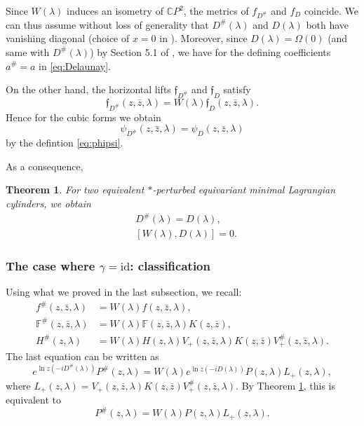 \documentclass[a4paper,11pt]{amsart}
\newtheorem{theorem}{Theorem}[section]
\theoremstyle{definition}
\numberwithin{equation}{section}
\begin{document}
Since $W(\lambda)$ induces an isometry of $\mathbb{C} P^2$, the metrics of  $f_{D^{\#}}$ and $f_{D}$ coincide. 
We can thus assume without loss of generality that $D^{\#}(\lambda)$ and $D(\lambda)$ both have vanishing diagonal (choice of $x=0$ in \cite{DoMaNL}). Moreover, since $D(\lambda)=\Omega(0)$ (and same with $D^{\#}(\lambda)$) by Section 5.1 of \cite{DoMaNL} , we have for the defining coefficients $a^{\#}=a$ in \eqref{eq:Delaunay}.


On the other hand, the horizontal lifts $\mathfrak{f}_{D^{\#}}$ and   $\mathfrak{f}_D$ satisfy
$$\mathfrak{f}_{D^{\#}}(z,\bar{z},\lambda)=W(\lambda) \mathfrak{f}_{D}(z,\bar{z},\lambda).$$
Hence for the cubic forms we obtain
$$\psi_{D^{\#}}(z,\bar{z},\lambda)=\psi_{D}(z,\bar{z},\lambda)$$
by the defintion \eqref{eq:phipsi}.  

As a consequence,
\begin{theorem}\label{thm:3.10}
For two equivalent $*$-perturbed equivariant minimal Lagrangian cylinders, we obtain
\begin{equation}\label{eq:3.10}
\begin{aligned}
& D^{\#}(\lambda)=D(\lambda),\\
& [W(\lambda), D(\lambda)]=0. 
\end{aligned}
\end{equation}
\end{theorem} 

\subsubsection{\textbf{The case where $\gamma=\mathrm{id}$: classification}}

Using what we proved in the last subsection, we recall:
\begin{equation*}
\begin{aligned}
f^{\#}(z,\bar{z},\lambda)&=W(\lambda) f(z,\bar{z},\lambda),\\
\mathbb{F}^{\#}(z,\bar{z},\lambda)&= W(\lambda) \mathbb{F}(z,\bar{z},\lambda)K(z,\bar{z}),\\
H^{\#}(z,\lambda)&= W(\lambda) H(z,\lambda)V_+(z,\bar{z},\lambda) K(z,\bar{z})V_+^{\#}(z,\bar{z},\lambda).
\end{aligned}
\end{equation*}
The last equation  can be written as
$$e^{\ln z(-iD^{\#}(\lambda))}P^{\#}(z,\lambda)=W(\lambda) e^{\ln z(-iD(\lambda))} P(z,\lambda) L_+(z,\lambda),$$
where $L_+(z,\lambda)=V_+(z,\bar{z},\lambda) K(z,\bar{z})V_+^{\#}(z,\bar{z},\lambda)$.
By Theorem \ref{thm:3.10}, this is equivalent to 
\begin{equation}\label{eq:4.1}
P^{\#}(z,\lambda)=W(\lambda)P(z,\lambda)L_+(z,\lambda).
\end{equation}
\end{document}
